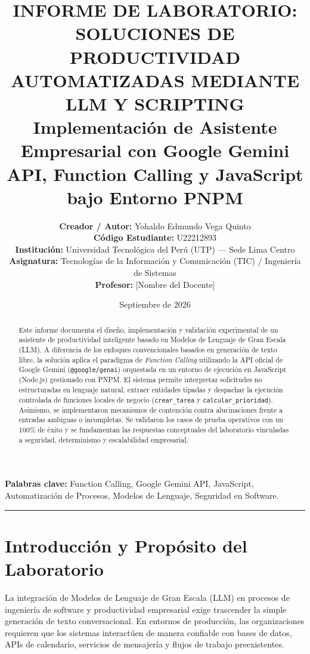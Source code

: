 \documentclass[11pt,a4paper]{article}
\title{
    \vspace{-1.5cm}
    \textbf{\Large INFORME DE LABORATORIO: SOLUCIONES DE PRODUCTIVIDAD AUTOMATIZADAS MEDIANTE LLM Y SCRIPTING}\\
    \vspace{0.3cm}
    \large Implementación de Asistente Empresarial con Google Gemini API, Function Calling y JavaScript bajo Entorno PNPM
}
\author{
    \textbf{Creador / Autor:} Yohaldo Edmundo Vega Quinto \\
    \textbf{Código Estudiante:} U22212893 \\
    \textbf{Institución:} Universidad Tecnológica del Perú (UTP) --- Sede Lima Centro \\
    \textbf{Asignatura:} Tecnologías de la Información y Comunicación (TIC) / Ingeniería de Sistemas \\
    \textbf{Profesor:} [Nombre del Docente]
}
\date{Septiembre de 2026}
\begin{document}
\maketitle

\begin{abstract}
Este informe documenta el diseño, implementación y validación experimental de un asistente de productividad inteligente basado en Modelos de Lenguaje de Gran Escala (LLM). A diferencia de los enfoques convencionales basados en generación de texto libre, la solución aplica el paradigma de \textit{Function Calling} utilizando la API oficial de Google Gemini (\texttt{@google/genai}) orquestada en un entorno de ejecución en JavaScript (Node.js) gestionado con PNPM. El sistema permite interpretar solicitudes no estructuradas en lenguaje natural, extraer entidades tipadas y despachar la ejecución controlada de funciones locales de negocio (\texttt{crear\_tarea} y \texttt{calcular\_prioridad}). Asimismo, se implementaron mecanismos de contención contra alucinaciones frente a entradas ambiguas o incompletas. Se validaron los casos de prueba operativos con un 100\% de éxito y se fundamentan las respuestas conceptuales del laboratorio vinculadas a seguridad, determinismo y escalabilidad empresarial.
\end{abstract}

\vspace{0.3cm}
\noindent\textbf{Palabras clave:} Function Calling, Google Gemini API, JavaScript, Automatización de Procesos, Modelos de Lenguaje, Seguridad en Software.

\vspace{0.5cm}
\hrule
\vspace{0.5cm}

\section{Introducción y Propósito del Laboratorio}

La integración de Modelos de Lenguaje de Gran Escala (LLM) en procesos de ingeniería de software y productividad empresarial exige trascender la simple generación de texto conversacional. En entornos de producción, las organizaciones requieren que los sistemas interactúen de manera confiable con bases de datos, APIs de calendario, servicios de mensajería y flujos de trabajo preexistentes.
\end{document}
